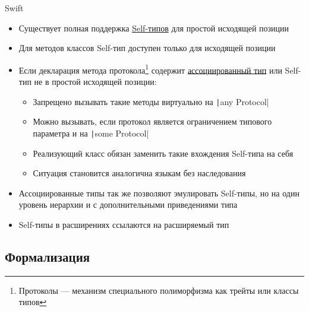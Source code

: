 \documentclass[usenames, dvipsnames]{beamer}
\begin{document}
    \begin{frame}{Swift}
        \begin{itemize}
            \item Существует полная поддержка \href{https://docs.swift.org/swift-book/documentation/the-swift-programming-language/types/\#Self-Type}{\color{blue}Self-типов} для простой исходящей позиции
            \item Для методов классов Self-тип доступен только для исходящей позиции
            \item Если декларация метода протокола\footnote{Протоколы --- механизм специального полиморфизма как трейты или классы типов} содержит \href{https://docs.swift.org/swift-book/documentation/the-swift-programming-language/generics/\#Associated-Types}{\color{blue}ассоциированный тип} или Self-тип не в простой исходящей позиции:
            \begin{itemize}
                \item Запрещено вызывать такие методы виртуально на \texttt|any Protocol|
                \item Можно вызывать, если протокол является ограничением типового параметра и на \texttt|some Protocol|
                \item Реализующий класс обязан заменить такие вхождения Self-типа на себя
                \item Ситуация становится аналогична языкам без наследования
            \end{itemize}
            \item Ассоциированные типы так же позволяют эмулировать Self-типы, но на один уровень иерархии и с дополнительными приведениями типа
            \item Self-типы в расширениях ссылаются на расширяемый тип
        \end{itemize}
    \end{frame}


    \subsection{Формализация}
\end{document}
